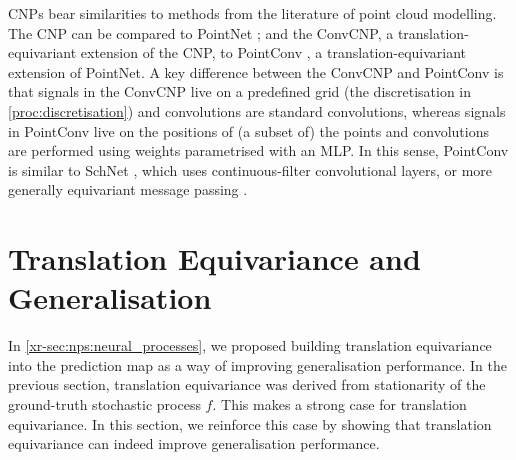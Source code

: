 \documentclass[12pt]{report}
\newcommand{\xrprefix}[1]{xr-#1}
\begin{document}
CNPs bear similarities to methods from the literature of point cloud modelling.
The CNP can be compared to PointNet \parencite{Qi:2017:PointNet_Deep_Learning_on_Point};
and the ConvCNP, a translation-equivariant extension of the CNP,
to PointConv \parencite{Wu:2019:PointConv_Deep_Convolutional_Networks_on}, 
a translation-equivariant extension of PointNet.
A key difference between the ConvCNP and PointConv is that signals in the ConvCNP live on a predefined grid (the discretisation in \cref{proc:discretisation}) and convolutions are standard convolutions, whereas signals in PointConv live on the positions of (a subset of) the points and convolutions are performed using weights parametrised with an MLP.
In this sense, PointConv is similar to SchNet
\parencite{Schutt:2017:SchNet_A_Continuous-Filter_Convolutional_Neural}, which uses continuous-filter convolutional layers, or more generally
equivariant message passing \parencite{Satorras:2021:En_Equivariant_Graph_Neural_Networks}. 

\section{Translation Equivariance and Generalisation}
\label{sec:convcnps:generalisation}

In \cref{\xrprefix{sec:nps:neural_processes}}, we proposed building translation equivariance into the prediction map as a way of improving generalisation performance.
In the previous section, translation equivariance was derived from stationarity of the ground-truth stochastic process $f$.
This makes a strong case for translation equivariance.
In this section, we reinforce this case by showing that translation equivariance can indeed improve generalisation performance.
\end{document}
